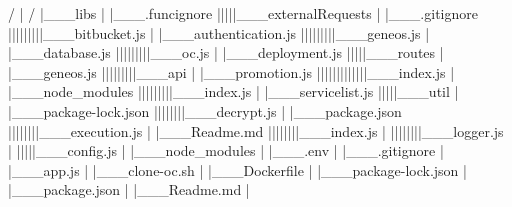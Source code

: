               /                                         |                      /                                          
              |___libs                                  |                     |___.funcignore                                        
              |||||___externalRequests                  |                     |___.gitignore                                         
              |||||||||___bitbucket.js                  |                     |___authentication.js                                          
              |||||||||___geneos.js                     |                     |___database.js                                        
              |||||||||___oc.js                         |                     |___deployment.js                                          
              |||||___routes                            |                     |___geneos.js                                          
              |||||||||___api                           |                     |___promotion.js  
              |||||||||||||___index.js                  |                     |___node_modules                                           
              |||||||||___index.js                      |                     |___servicelist.js                                         
              |||||___util                              |                     |___package-lock.json                                          
              ||||||||___decrypt.js                     |                     |___package.json                                           
              ||||||||___execution.js                   |                     |___Readme.md                                          
              ||||||||___index.js                       |                       
              ||||||||___logger.js                      |                         
              |||||___config.js                         |                   
              |___node_modules                          |                 
              |___.env                                  | 
              |___.gitignore                            |             
              |___app.js                                |     
              |___clone-oc.sh                           |               
              |___Dockerfile                            |             
              |___package-lock.json                     |                           
              |___package.json                          |                 
              |___Readme.md                             |           


